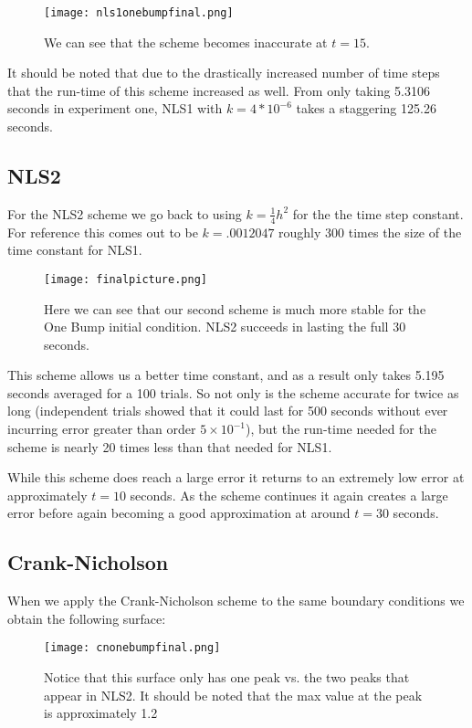 \documentclass[11pt, oneside]{article}   	%
\begin{document}
\begin{figure}[H]
    \centering
    \texttt{[image: nls1onebumpfinal.png]}
    \caption{We can see that the scheme becomes inaccurate at $t=15$.}
    \label{fig:exp2surf}
\end{figure}

It should be noted that due to the drastically increased number of time steps that the run-time of this scheme increased as well. From only taking 5.3106 seconds in experiment one, NLS1 with $k=4*10^{-6}$ takes a staggering 125.26 seconds. 

\subsection{NLS2}
For the NLS2 scheme we go back to using $k=\frac{1}{4}h^2$ for the the time step constant. For reference this comes out to be $k=.0012047$ roughly 300 times the size of the time constant for NLS1.
\vspace{1cm}
\begin{figure}[H]
    \centering
    \texttt{[image: finalpicture.png]}
    \caption{Here we can see that our second scheme is much more stable for the One Bump initial condition. NLS2 succeeds in lasting the full 30 seconds.}
    \label{fig:exp2nls2}
\end{figure}

This scheme allows us a better time constant, and as a result only takes 5.195 seconds averaged for a 100 trials. So not only is the scheme accurate for twice as long (independent trials showed that it could last for 500 seconds without ever incurring error greater than order $5\times10^{-1}$), but the run-time needed for the scheme is nearly 20 times less than that needed for NLS1.

While this scheme does reach a large error it returns to an extremely low error at approximately $t = 10$ seconds. As the scheme continues it again creates a large error before again becoming a good approximation at around $t = 30$ seconds. \\

\subsection{Crank-Nicholson}
When we apply the Crank-Nicholson scheme to the same boundary conditions we obtain the following surface:

\begin{figure}[H]
    \centering
    \texttt{[image: cnonebumpfinal.png]}
    \caption{Notice that this surface only has one peak vs. the two peaks that appear in NLS2. It should be noted that the max value at the peak is approximately 1.2}
    \label{fig:exp2surf}
\end{figure}
\end{document}
